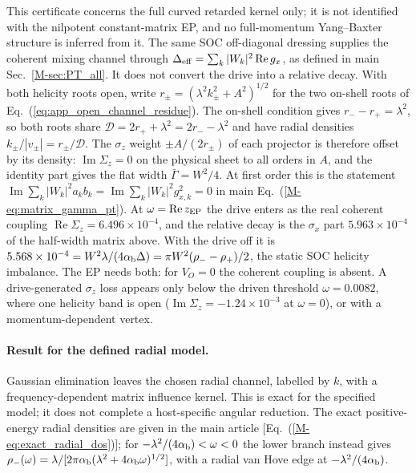\documentclass[%
  aps,physrev,onecolumn,10pt,amsmath,amssymb,superscriptaddress,longbibliography,floatfix
]{revtex4-2}
\begin{document}
This certificate concerns the full curved retarded kernel only; it is not identified with the nilpotent constant-matrix EP, and no full-momentum Yang--Baxter structure is inferred from it.  The same SOC
off-diagonal dressing supplies the coherent mixing channel through
$\Delta_{\rm eff}=\sum_k|W_k|^2\operatorname{Re}g_x$, as defined in main Sec.~\ref{M-sec:PT_all}.  It does not convert the drive into a
relative decay.  With both helicity roots open, write
$r_\pm=(\lambda^2k_\pm^2+A^2)^{1/2}$ for the two on-shell roots of
Eq.~(\ref{eq:app_open_channel_residue}).  The on-shell condition gives $r_--r_+=\lambda^2$, so both roots share $\mathcal D=2r_++\lambda^2=2r_--\lambda^2$
and have radial densities $k_\pm/|v_\pm|=r_\pm/\mathcal D$.  The $\sigma_z$
weight $\pm A/(2r_\pm)$ of each projector is therefore offset by its density:
$\operatorname{Im}\Sigma_z=0$ on the physical sheet to all orders in $A$, and
the identity part gives the flat width $\bar\Gamma=W^2/4$.  At first order this
is the statement $\operatorname{Im}\sum_k|W_k|^2a_kb_k=
\operatorname{Im}\sum_k|W_k|^2g_{x,k}^2=0$ in main
Eq.~(\ref{M-eq:matrix_gamma_pt}).  At $\omega=\operatorname{Re}z_{\rm EP}$ the
drive enters as the real coherent coupling
$\operatorname{Re}\Sigma_z=6.496\times10^{-4}$, and the relative decay is the
$\sigma_x$ part $5.963\times10^{-4}$ of the half-width matrix above.  With the
drive off it is $5.568\times10^{-4}=W^2\lambda/(4\alpha_{\rm b}\Delta)
=\pi W^2(\rho_--\rho_+)/2$, the static SOC helicity imbalance.  The EP needs
both: for $V_O=0$ the coherent coupling is absent.  A drive-generated
$\sigma_z$ loss appears only below the driven threshold
$\omega=0.0082$, where one helicity band is open
($\operatorname{Im}\Sigma_z=-1.24\times10^{-3}$ at $\omega=0$), or with a
momentum-dependent vertex.

\paragraph{Result for the defined radial model.}
Gaussian elimination leaves the chosen radial channel, labelled by $k$,
with a frequency-dependent matrix influence kernel.  This is exact for the
specified model; it does not complete a host-specific angular reduction.
The exact positive-energy radial densities are given in the main article [Eq.~(\ref{M-eq:exact_radial_dos})]; for $-\lambda^2/(4\alpha_{\rm b})<\omega<0$ the lower branch instead gives $\rho_-(\omega)=\lambda/[2\pi\alpha_{\rm b}(\lambda^2+4\alpha_{\rm b}\omega)^{1/2}]$, with a radial van Hove edge at $-\lambda^2/(4\alpha_{\rm b})$.
\end{document}
